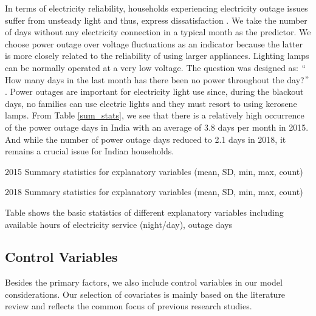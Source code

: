 \documentclass[11pt,english]{article}
\theoremstyle{plain} \newtheorem{claim}{Claim}
\theoremstyle{plain} \newtheorem{prop}{Proposition}
\theoremstyle{plain} \newtheorem{hypo}{Hypothesis}
\begin{document}
In terms of electricity reliability, households experiencing electricity outage issues suffer from unsteady light and thus, express dissatisfaction \citep{Aklinetal2016}. We take the number of days without any electricity connection in a typical month as the predictor. We choose power outage over voltage fluctuations as an indicator because the latter is more closely related to the reliability of using larger appliances. Lighting lamps can be normally operated at a very low voltage. The question was designed as: $``$How many days in the last month has there been no power throughout the day?$"$. Power outages are important for electricity light use since, during the blackout days, no families can use electric lights and they must resort to using kerosene lamps. From Table \ref{sum_stats}, we see that there is a relatively high occurrence of the power outage days in India with an average of 3.8 days per month in 2015. And while the number of power outage days reduced to 2.1 days in 2018, it remains a crucial issue for Indian households.


\begin{table}[ht!]
\centering
\begin{subtable}[b]{\textwidth}
\centering

\caption{2015 Summary statistics for explanatory variables (mean, SD, min, max, count)}
\end{subtable}
\begin{subtable}[b]{\textwidth}
\centering

\caption{2018 Summary statistics for explanatory variables (mean, SD, min, max, count)}
\end{subtable}
\caption{Table shows the basic statistics of different explanatory variables including available hours of electricity service (night/day), outage days}
\label{sum_stats}
\end{table}

\subsection{Control Variables}

Besides the primary factors, we also include control variables in our model considerations. Our selection of covariates is mainly based on the literature review and reflects the common focus of previous research studies.
\end{document}
